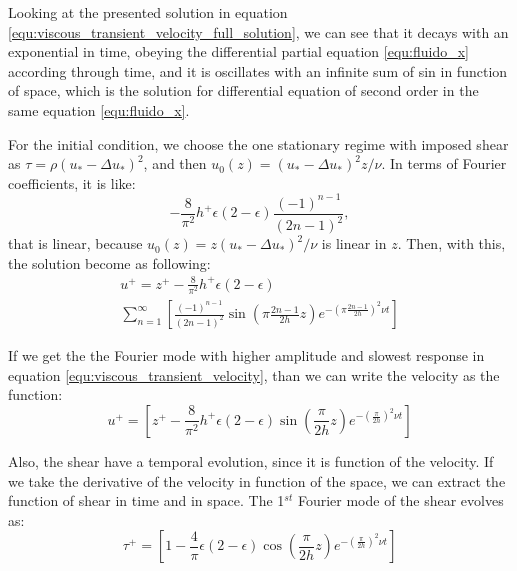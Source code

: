     Looking at the presented solution in equation \ref{equ:viscous_transient_velocity_full_solution}, we can see that it decays with an exponential in time, obeying the differential partial equation \ref{equ:fluido_x} according through time, and it is oscillates with an infinite sum of sin in function of space, which is the solution for differential equation of second order in the same equation \ref{equ:fluido_x}.

    For the initial condition, we choose the one stationary regime with imposed shear as $\tau = \rho {\left(u_*-\Delta u_*\right)}^2$, and then $u_0(z)=(u_*-\Delta u_*)^2 z/\nu$. In terms of Fourier coefficients, it is like:
    \begin{equation}
        -\frac{8}{\pi^2}h^+ \epsilon\left(2-\epsilon\right)\frac{\left(-1\right)^{n-1}}{\left(2n-1\right)^2},
    \end{equation}
that is linear, because $u_0(z) = z(u_*-\Delta u_*)^2/\nu$ is linear in $z$. Then, with this, the solution become as following:
\begin{equation}
    \begin{split}
        u^+ = z^+ -\frac{8}{\pi^2}h^+\epsilon\left(2-\epsilon\right)\\
        \sum_{n=1}^\infty\left[
        {\frac{\left(-1\right)^{n-1}}{\left(2n-1\right)^2}}
        {\sin\left(\pi\frac{2n-1}{2h}z\right)}
        {e^{-{\left(\pi\frac{2n-1}{2h}\right)}^2\nu t}}
        \right]
    \end{split}
    \label{equ:viscous_transient_velocity}
\end{equation}

    If we get the the Fourier mode with higher amplitude and slowest response in equation \ref{equ:viscous_transient_velocity}, than we can write the velocity as the function:
    \begin{equation}
        u^+ = \left[z^+ -\frac{8}{\pi^2}h^+\epsilon\left(2-\epsilon\right)\sin\left(\frac{\pi}{2h}z\right)e^{-{\left(\frac{\pi}{2h}\right)}^2\nu t}\right]
        \label{equ:viscous_transient_velocity1}
    \end{equation}

    Also, the shear have a temporal evolution, since it is function of the velocity. If we take the derivative of the velocity in function of the space, we can extract the function of shear in time and in space. The 1$^{st}$ Fourier mode of the shear evolves as:
    \begin{equation}
        \tau^+ = \left[1 -\frac{4}{\pi}\epsilon\left(2-\epsilon\right)\cos\left(\frac{\pi}{2h}z\right)e^{-{\left(\frac{\pi}{2h}\right)}^2\nu t}\right]
        \label{equ:viscous_transient_shear1}
    \end{equation}

